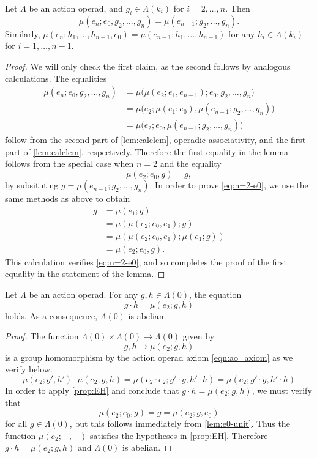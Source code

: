 \begin{lem}\label{lem:e0-unit}
Let $\Lambda$ be an action operad, and $g_i \in \Lambda(k_i)$ for $i=2, \ldots, n$. Then
\[
\mu(e_n; e_0, g_2, \ldots, g_n) = \mu(e_{n-1}; g_2, \ldots, g_n).
\]
Similarly, $\mu(e_n; h_1, \ldots, h_{n-1}, e_0) = \mu(e_{n-1}; h_1, \ldots, h_{n-1})$ for any $h_i \in \Lambda(k_i)$ for $i=1, \ldots, n-1$.
\end{lem}
\begin{proof}
We will only check the first claim, as the second follows by analogous calculations.
The equalities
\begin{align*}
\mu(e_n; e_0, g_2, \ldots, g_n) & = \mu \big( \mu(e_2; e_1, e_{n-1}); e_0, g_2, \ldots, g_n \big) \\
& = \mu\big( e_2; \mu(e_1; e_0), \mu(e_{n-1}; g_2, \ldots, g_n) \big) \\
& = \mu\big( e_2; e_0, \mu(e_{n-1}; g_2, \ldots, g_n) \big)
\end{align*}
follow from the second part of \cref{lem:calclem}, operadic associativity, and the first part of \cref{lem:calclem}, respectively.
Therefore the first equality in the lemma follows from the special case when $n=2$ and the equality
\begin{equation}\label{eq:n=2-e0}
\mu(e_2; e_0, g) = g,
\end{equation}
by subsituting $g = \mu(e_{n-1}; g_2, \ldots, g_n)$.
In order to prove \cref{eq:n=2-e0}, we use the same methods as above to obtain
  \begin{align*}
   g & = \mu(e_1; g) \\
    &= \mu(\mu(e_2; e_0, e_1); g) \\
    & = \mu(\mu(e_2; e_0, e_1); \mu(e_1; g)) \\
    & = \mu(e_2; e_0, g).
  \end{align*}
This calculation verifies \cref{eq:n=2-e0}, and so completes the proof of the first equality in the statement of the lemma.
\end{proof}

\begin{cor}\label{cor:G0abel}
Let $\Lambda$ be an action operad. For any $g, h \in \Lambda(0)$, the equation
\[
g \cdot h = \mu(e_2; g,h)
\]
holds. As a consequence, $\Lambda(0)$ is abelian.
\end{cor}
\begin{proof}
The function $\Lambda(0) \times \Lambda(0) \to \Lambda(0)$ given by
\[
g, h \mapsto \mu(e_2; g, h)
\]
is a group homomorphism by the action operad axiom \cref{eqn:ao_axiom} as we verify below.
\[
\mu(e_2; g', h') \cdot \mu(e_2; g, h) = \mu(e_2 \cdot e_2; g' \cdot g, h' \cdot h) = \mu(e_2; g' \cdot g, h' \cdot h)
\]
In order to apply \cref{prop:EH} and conclude that $g \cdot h = \mu(e_2; g, h)$, we must verify that 
\[
\mu(e_2; e_0, g) = g = \mu(e_2; g, e_0)
\]
for all $g \in \Lambda(0)$, but this follows immediately from \cref{lem:e0-unit}.
Thus the function $\mu(e_2; -,-)$ satisfies the hypotheses in \cref{prop:EH}.
  Therefore $g \cdot h = \mu(e_2; g,h)$ and $\Lambda(0)$ is abelian.
\end{proof}

